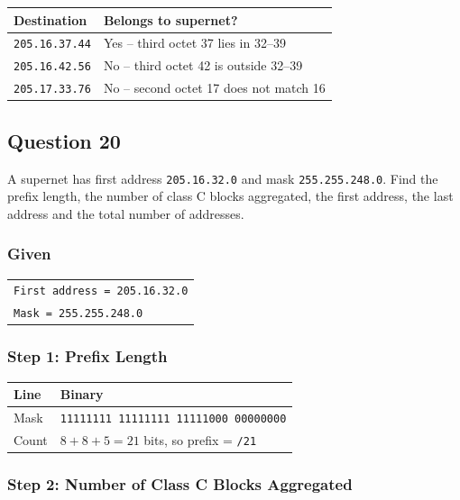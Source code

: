 \documentclass[11pt,a4paper]{article}
\begin{document}
\begin{tabularx}{\textwidth}{@{}lX@{}}
\toprule
\rowcolor{tablehead}\textbf{Destination} & \textbf{Belongs to supernet?} \\
\midrule
\texttt{205.16.37.44} & Yes -- third octet 37 lies in 32--39 \\
\texttt{205.16.42.56} & No -- third octet 42 is outside 32--39 \\
\texttt{205.17.33.76} & No -- second octet 17 does not match 16 \\
\bottomrule
\end{tabularx}

\subsection*{Question 20}

A supernet has first address \texttt{205.16.32.0} and mask \texttt{255.255.248.0}. Find the
prefix length, the number of class C blocks aggregated, the first address, the last address
and the total number of addresses.

\subsubsection*{Given}

\begin{tabularx}{\textwidth}{@{}X@{}}
\texttt{First address = 205.16.32.0} \\
\texttt{Mask = 255.255.248.0} \\
\end{tabularx}

\subsubsection*{Step 1: Prefix Length}

\begin{tabularx}{\textwidth}{@{}lX@{}}
\toprule
\rowcolor{tablehead}\textbf{Line} & \textbf{Binary} \\
\midrule
Mask & \texttt{11111111 11111111 11111000 00000000} \\
Count & $8 + 8 + 5 = 21$ bits, so prefix = \texttt{/21} \\
\bottomrule
\end{tabularx}

\subsubsection*{Step 2: Number of Class C Blocks Aggregated}
\end{document}
